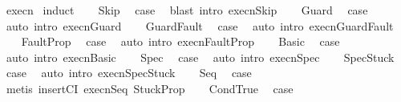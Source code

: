 \begin{isabellebody}
%
\isadelimproof
%
\endisadelimproof
%
\isatagproof
{}\isamarkupfalse%
\ execn\isanewline
{}\isamarkupfalse%
\ {\isacharparenleft}induct{\isacharparenright}\isanewline
\ \ \isamarkupfalse%
\ Skip\ \isamarkupfalse%
\ {\isacharquery}case\ \isamarkupfalse%
\ {\isacharparenleft}blast\ intro{\isacharcolon}\ execn{\isachardot}Skip{\isacharparenright}\isanewline
{}\isamarkupfalse%
\isanewline
\ \ \isamarkupfalse%
\ Guard\ \isamarkupfalse%
\ {\isacharquery}case\ \isamarkupfalse%
\ {\isacharparenleft}auto\ intro{\isacharcolon}\ execn{\isachardot}Guard{\isacharparenright}\isanewline
{}\isamarkupfalse%
\isanewline
\ \ \isamarkupfalse%
\ GuardFault\ \isamarkupfalse%
\ {\isacharquery}case\ \isamarkupfalse%
\ {\isacharparenleft}auto\ intro{\isacharcolon}\ execn{\isachardot}GuardFault{\isacharparenright}\isanewline
{}\isamarkupfalse%
\isanewline
\ \ \isamarkupfalse%
\ FaultProp\ \isamarkupfalse%
\ {\isacharquery}case\ \isamarkupfalse%
\ {\isacharparenleft}auto\ intro{\isacharcolon}\ execn{\isachardot}FaultProp{\isacharparenright}\isanewline
{}\isamarkupfalse%
\isanewline
\ \ \isamarkupfalse%
\ Basic\ \isamarkupfalse%
\ {\isacharquery}case\ \isamarkupfalse%
\ {\isacharparenleft}auto\ intro{\isacharcolon}\ execn{\isachardot}Basic{\isacharparenright}\isanewline
{}\isamarkupfalse%
\isanewline
\ \ \isamarkupfalse%
\ Spec\ \isamarkupfalse%
\ {\isacharquery}case\ \isamarkupfalse%
\ {\isacharparenleft}auto\ intro{\isacharcolon}\ execn{\isachardot}Spec{\isacharparenright}\isanewline
{}\isamarkupfalse%
\isanewline
\ \ \isamarkupfalse%
\ SpecStuck\ \isamarkupfalse%
\ {\isacharquery}case\ \isamarkupfalse%
\ {\isacharparenleft}auto\ intro{\isacharcolon}\ execn{\isachardot}SpecStuck{\isacharparenright}\isanewline
{}\isamarkupfalse%
\isanewline
\ \ \isamarkupfalse%
\ Seq\ \isamarkupfalse%
\ {\isacharquery}case\ \isamarkupfalse%
\ {\isacharparenleft}metis\ insertCI\ execn{\isachardot}Seq\ StuckProp{\isacharparenright}\isanewline
{}\isamarkupfalse%
\isanewline
\ \ \isamarkupfalse%
\ CondTrue\ \isamarkupfalse%
\ {\isacharquery}case\ \isamarkupfalse%

\end{isabellebody}
